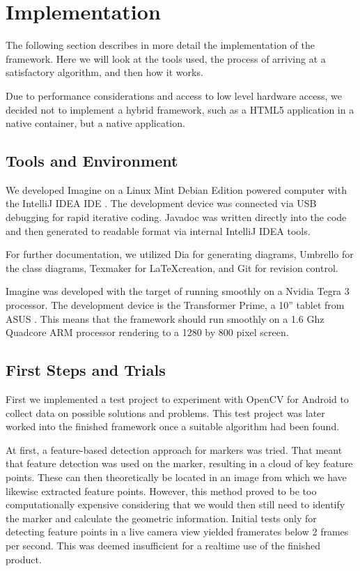 \section{Implementation}

The following section describes in more detail the implementation of the framework.
Here we will look at the tools used, the process of arriving at a satisfactory algorithm, and then how it works.

Due to performance considerations and access to low level hardware access, we decided not to implement a hybrid framework, such as a HTML5 application in a native container, but a native application\cite{sabrina918}.

\subsection{Tools and Environment}

We developed Imagine on a Linux Mint Debian Edition powered computer with the IntelliJ IDEA IDE \cite{idea}.
The development device was connected via USB debugging for rapid iterative coding.
Javadoc was written directly into the code and then generated to readable format via internal IntelliJ IDEA tools.

For further documentation, we utilized Dia \cite{dia} for generating diagrams, Umbrello \cite{umbrello} for the class diagrams, Texmaker \cite{texmaker} for \LaTeX  creation, and Git \cite{git} for revision control.

Imagine was developed with the target of running smoothly on a Nvidia Tegra 3 processor.
The development device is the Transformer Prime, a 10'' tablet from ASUS \cite{devicedev}.
This means that the framework should run smoothly on a 1.6 Ghz Quadcore ARM processor rendering to a 1280 by 800 pixel screen.

\subsection{First Steps and Trials}

First we implemented a test project to experiment with OpenCV for Android to collect data on possible solutions and problems.
This test project was later worked into the finished framework once a suitable algorithm had been found.

At first, a feature-based detection approach for markers was tried.
That meant that feature detection was used on the marker, resulting in a cloud of key feature points.
These can then theoretically be located in an image from which we have likewise extracted feature points.
However, this method proved to be too computationally expensive considering that we would then still need to identify the marker and calculate the geometric information.
Initial tests only for detecting feature points in a live camera view yielded framerates below 2 frames per second.
This was deemed insufficient for a realtime use of the finished product.


